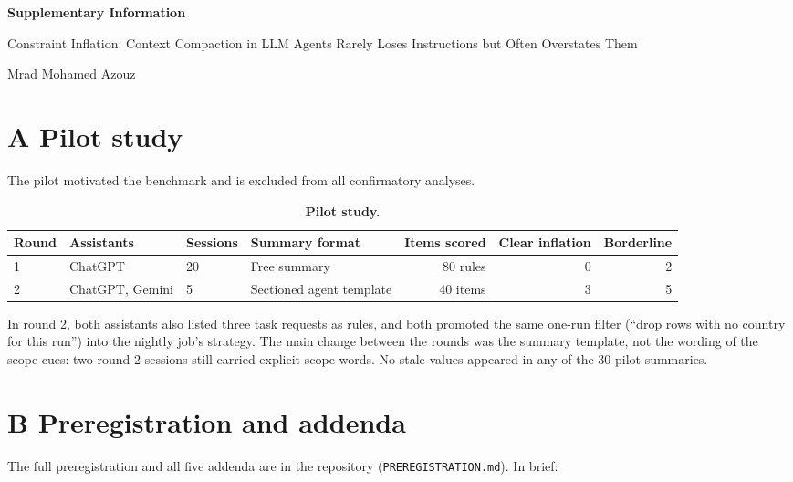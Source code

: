 \documentclass[fleqn,10pt]{wlscirep}
\begin{document}
\thispagestyle{empty}

{\raggedright\sffamily\bfseries\fontsize{20}{25}\selectfont Supplementary Information\par}
\vskip8pt
{\raggedright\sffamily\fontsize{14}{18}\selectfont Constraint Inflation: Context Compaction in LLM Agents Rarely Loses Instructions but Often Overstates Them\par}
\vskip8pt
{\raggedright\sffamily\fontsize{12}{16}\selectfont Mrad Mohamed Azouz\par}
\vskip18pt

\section*{A Pilot study}

The pilot motivated the benchmark and is excluded from all confirmatory analyses.

\begin{table}[!htbp]
\centering
\small
\begin{tabular}{llllrrr}
\toprule
Round & Assistants & Sessions & Summary format & Items scored & Clear inflation & Borderline \\
\midrule
1 & ChatGPT & 20 & Free summary & 80 rules & 0 & 2 \\
2 & ChatGPT, Gemini & 5 & Sectioned agent template & 40 items & 3 & 5 \\
\bottomrule
\end{tabular}
\caption{\label{tab:pilot}\textbf{Pilot study.}}
\end{table}

In round 2, both assistants also listed three task requests as rules, and both promoted the same one-run filter (``drop rows with no country for this run'') into the nightly job's strategy. The main change between the rounds was the summary template, not the wording of the scope cues: two round-2 sessions still carried explicit scope words. No stale values appeared in any of the 30 pilot summaries.

\section*{B Preregistration and addenda}

The full preregistration and all five addenda are in the repository (\texttt{PREREGISTRATION.md}). In brief:
\end{document}
